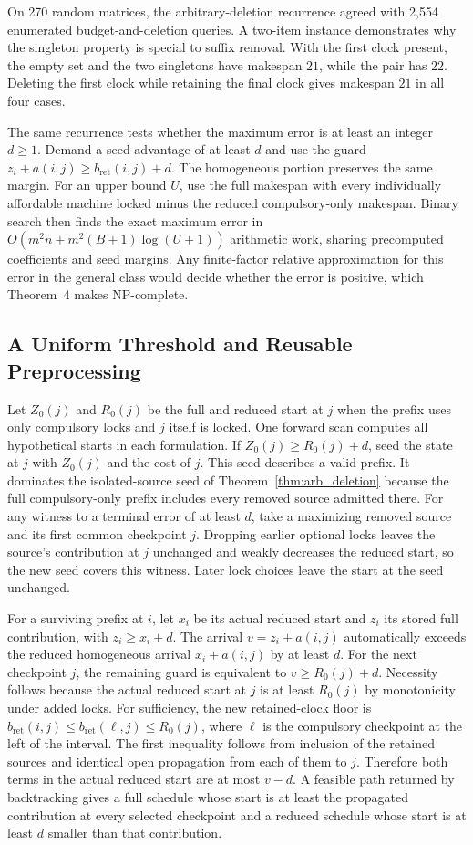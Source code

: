 \documentclass[11pt,letterpaper]{article}
\begin{document}
On 270 random matrices, the arbitrary-deletion recurrence agreed with 2,554 enumerated budget-and-deletion queries. A two-item instance demonstrates why the singleton property is special to suffix removal. With the first clock present, the empty set and the two singletons have makespan $21$, while the pair has $22$. Deleting the first clock while retaining the final clock gives makespan $21$ in all four cases.

The same recurrence tests whether the maximum error is at least an integer $d\ge 1$. Demand a seed advantage of at least $d$ and use the guard $z_i+a(i,j)\ge b_{\mathrm{ret}}(i,j)+d$. The homogeneous portion preserves the same margin. For an upper bound $U$, use the full makespan with every individually affordable machine locked minus the reduced compulsory-only makespan. Binary search then finds the exact maximum error in $O(m^2n+m^2(B+1)\log(U+1))$ arithmetic work, sharing precomputed coefficients and seed margins. Any finite-factor relative approximation for this error in the general class would decide whether the error is positive, which Theorem~4 makes NP-complete.

\subsection{A Uniform Threshold and Reusable Preprocessing}

Let $Z_0(j)$ and $R_0(j)$ be the full and reduced start at $j$ when the prefix uses only compulsory locks and $j$ itself is locked. One forward scan computes all hypothetical starts in each formulation. If $Z_0(j)\ge R_0(j)+d$, seed the state at $j$ with $Z_0(j)$ and the cost of $j$. This seed describes a valid prefix. It dominates the isolated-source seed of Theorem~\ref{thm:arb_deletion} because the full compulsory-only prefix includes every removed source admitted there. For any witness to a terminal error of at least $d$, take a maximizing removed source and its first common checkpoint $j$. Dropping earlier optional locks leaves the source's contribution at $j$ unchanged and weakly decreases the reduced start, so the new seed covers this witness. Later lock choices leave the start at the seed unchanged.

For a surviving prefix at $i$, let $x_i$ be its actual reduced start and $z_i$ its stored full contribution, with $z_i\ge x_i+d$. The arrival $v=z_i+a(i,j)$ automatically exceeds the reduced homogeneous arrival $x_i+a(i,j)$ by at least $d$. For the next checkpoint $j$, the remaining guard is equivalent to $v\ge R_0(j)+d$. Necessity follows because the actual reduced start at $j$ is at least $R_0(j)$ by monotonicity under added locks. For sufficiency, the new retained-clock floor is $b_{\mathrm{ret}}(i,j)\le b_{\mathrm{ret}}(\ell,j)\le R_0(j)$, where $\ell$ is the compulsory checkpoint at the left of the interval. The first inequality follows from inclusion of the retained sources and identical open propagation from each of them to $j$. Therefore both terms in the actual reduced start are at most $v-d$. A feasible path returned by backtracking gives a full schedule whose start is at least the propagated contribution at every selected checkpoint and a reduced schedule whose start is at least $d$ smaller than that contribution.
\end{document}
